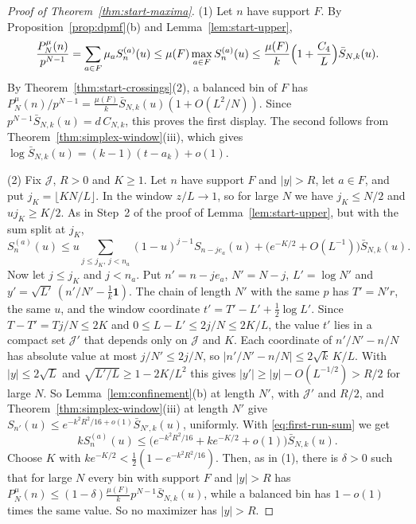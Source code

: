 \begin{proof}[Proof of Theorem~\ref{thm:start-maxima}]
(1) Let $n$ have support $F$. By Proposition~\ref{prop:dpmf}(b) and
Lemma~\ref{lem:start-upper},
\[
 \frac{P^\mu_N(n)}{p^{N-1}}=\sum_{a\in F}\mu_aS^{(a)}_n(u)
 \le\mu(F)\max_{a\in F}S^{(a)}_n(u)
 \le\frac{\mu(F)}k\Bigl(1+\frac{C_4}L\Bigr)\bar S_{N,k}(u).
\]
By Theorem~\ref{thm:start-crossings}(2), a balanced bin of $F$ has
$P^\mu_N(n)/p^{N-1}=\frac{\mu(F)}k\bar S_{N,k}(u)(1+O(L^2/N))$. Since
$p^{N-1}\bar S_{N,k}(u)=d\,C_{N,k}$, this proves the first display. The second
follows from Theorem~\ref{thm:simplex-window}(iii), which gives
$\log\bar S_{N,k}(u)=(k-1)(t-a_k)+o(1)$.

(2) Fix $\mathcal J$, $R>0$ and $K\ge1$. Let $n$ have support $F$ and $|y|>R$,
let $a\in F$, and put $j_K=\lfloor KN/L\rfloor$. In the window $z/L\to1$, so
for large $N$ we have $j_K\le N/2$ and $uj_K\ge K/2$. As in Step~2 of the proof
of Lemma~\ref{lem:start-upper}, but with the sum split at $j_K$,
\[
 S^{(a)}_n(u)\le u\sum_{j\le j_K,\,j<n_a}(1-u)^{j-1}S_{n-je_a}(u)
 +\bigl(e^{-K/2}+O(L^{-1})\bigr)\bar S_{N,k}(u).
\]
Now let $j\le j_K$ and $j<n_a$. Put $n'=n-je_a$, $N'=N-j$, $L'=\log N'$ and
$y'=\sqrt{L'}\,(n'/N'-\frac1k\mathbf1)$. The chain of length $N'$ with the same
$p$ has $T'=N'r$, the same $u$, and the window coordinate
$t'=T'-L'+\frac12\log L'$. Since $T-T'=Tj/N\le2K$ and $0\le L-L'\le2j/N\le2K/L$,
the value $t'$ lies in a compact set $\mathcal J'$ that depends only on
$\mathcal J$ and $K$. Each coordinate of $n'/N'-n/N$ has absolute value at most
$j/N'\le2j/N$, so $|n'/N'-n/N|\le2\sqrt k\,K/L$. With $|y|\le2\sqrt L$ and
$\sqrt{L'/L}\ge1-2K/L^2$ this gives $|y'|\ge|y|-O(L^{-1/2})>R/2$ for large $N$.
So Lemma~\ref{lem:confinement}(b) at length $N'$, with $\mathcal J'$ and $R/2$,
and Theorem~\ref{thm:simplex-window}(iii) at length $N'$ give
$S_{n'}(u)\le e^{-k^2R^2/16+o(1)}\bar S_{N',k}(u)$, uniformly. With
\eqref{eq:first-run-sum} we get
\[
 kS^{(a)}_n(u)\le\bigl(e^{-k^2R^2/16}+ke^{-K/2}+o(1)\bigr)\bar S_{N,k}(u).
\]
Choose $K$ with $ke^{-K/2}<\frac12(1-e^{-k^2R^2/16})$. Then, as in (1), there
is $\delta>0$ such that for large $N$ every bin with support $F$ and $|y|>R$ has
$P^\mu_N(n)\le(1-\delta)\frac{\mu(F)}kp^{N-1}\bar S_{N,k}(u)$, while a balanced
bin has $1-o(1)$ times the same value. So no maximizer has $|y|>R$.
\end{proof}

